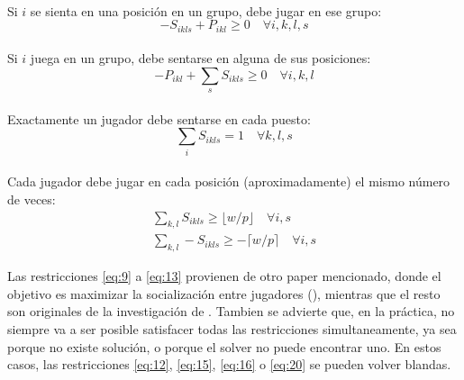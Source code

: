 \documentclass[letter, 10pt]{article}
\begin{document}
\\
Si $i$ se sienta en una posición en un grupo, debe jugar en ese grupo:
\begin{equation}
    -S_{ikls} + P_{ikl} \geq 0 \quad \forall i,k,l,s
    \label{eq:17}
\end{equation}
\\
Si $i$ juega en un grupo, debe sentarse en alguna de sus posiciones:
\begin{equation}
    -P_{ikl} +\sum_s S_{ikls} \geq 0 \quad \forall i,k,l
    \label{eq:18}
\end{equation}
\\
Exactamente un jugador debe sentarse en cada puesto:
\begin{equation}
    \sum_i S_{ikls} = 1 \quad \forall k,l,s
    \label{eq:19}
\end{equation}
\\
Cada jugador debe jugar en cada posición (aproximadamente) el mismo número de veces:
\begin{equation}
\begin{aligned}
    \sum_{k,l} S_{ikls} \geq \lfloor w/p \rfloor \quad \forall i,s \\
    \sum_{k,l} -S_{ikls} \geq -\lceil w/p \rceil \quad \forall i,s
    \label{eq:20}
\end{aligned}
\end{equation}

Las restricciones \ref{eq:9} a \ref{eq:13} provienen de otro paper mencionado, donde el objetivo es maximizar la socialización entre jugadores (\cite{csplib:prob010}), mientras que el resto son originales de la investigación de \cite{lester21pb}. Tambien se advierte que, en la práctica, no siempre va a ser posible satisfacer todas las restricciones simultaneamente, ya sea porque no existe solución, o porque el solver no puede encontrar uno. En estos casos, las restricciones \ref{eq:12}, \ref{eq:15}, \ref{eq:16} o \ref{eq:20} se pueden volver blandas.
\end{document}
